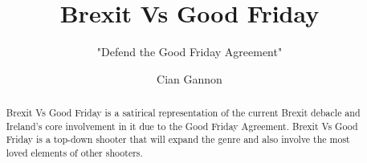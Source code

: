 \documentclass[a4paper]{scrreprt}
\title{Brexit Vs Good Friday}
\subtitle{"Defend the Good Friday Agreement"}
\author{Cian Gannon}
\begin{document}
    \maketitle

    \begin{abstract}
        
        Brexit Vs Good Friday is a satirical representation of the current Brexit debacle and Ireland's core involvement in it due to the Good Friday Agreement. 
        Brexit Vs Good Friday is a top-down shooter that will expand the genre and also involve the most loved elements of other shooters.
        
    \end{abstract}
\end{document}
